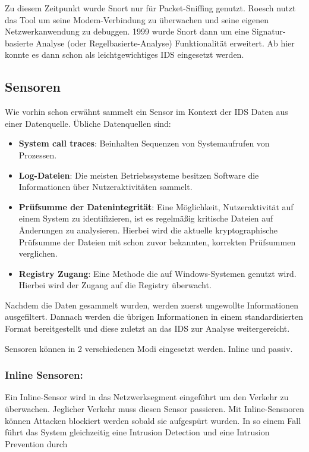 Zu diesem Zeitpunkt wurde Snort nur für Packet-Sniffing genutzt. Roesch nutzt das Tool um seine Modem-Verbindung zu überwachen und seine eigenen Netzwerkanwendung zu debuggen. 1999 wurde Snort dann um eine Signatur-basierte Analyse (oder Regelbasierte-Analyse) Funktionalität erweitert. Ab hier konnte es dann schon als leichtgewichtiges IDS eingesetzt werden.\cite{snort_book_1}

\subsection{Sensoren}

Wie vorhin schon erwähnt sammelt ein Sensor im Kontext der IDS Daten aus einer Datenquelle. Übliche Datenquellen sind: \cite{IDS_Book_2}

\begin{itemize}
    \item \textbf{System call traces}: Beinhalten Sequenzen von Systemaufrufen von Prozessen. \cite{IDS_Book_2}
    \item \textbf{Log-Dateien}: Die meisten Betriebssysteme besitzen Software die Informationen über Nutzeraktivitäten sammelt.\cite{IDS_Book_2}
    \item \textbf{Prüfsumme der Datenintegrität}: Eine Möglichkeit, Nutzeraktivität auf einem System zu identifizieren, ist es regelmäßig kritische Dateien auf Änderungen zu analysieren. Hierbei wird die aktuelle kryptographische Prüfsumme der Dateien mit schon zuvor bekannten, korrekten Prüfsummen verglichen.\cite{IDS_Book_2}
    \item \textbf{Registry Zugang}: Eine Methode die auf Windows-Systemen genutzt wird. Hierbei wird der Zugang auf die Registry überwacht.\cite{IDS_Book_2}
\end{itemize}

Nachdem die Daten gesammelt wurden, werden zuerst ungewollte Informationen ausgefiltert. Dannach werden die übrigen Informationen in einem standardisierten Format bereitgestellt und diese zuletzt an das IDS zur Analyse weitergereicht.\cite{IDS_Book_2}

Sensoren können in 2 verschiedenen Modi eingesetzt werden. Inline und passiv.\cite{IDS_Book_2}

\subsubsection{Inline Sensoren:}
Ein Inline-Sensor wird in das Netzwerksegment eingeführt um den Verkehr zu überwachen. Jeglicher Verkehr muss diesen Sensor passieren. Mit Inline-Sensnoren können Attacken blockiert werden sobald sie aufgespürt wurden. In so einem Fall führt das System gleichzeitig eine Intrusion Detection und eine Intrusion Prevention durch\cite{url_sensors}\cite{IDS_Book_2}

